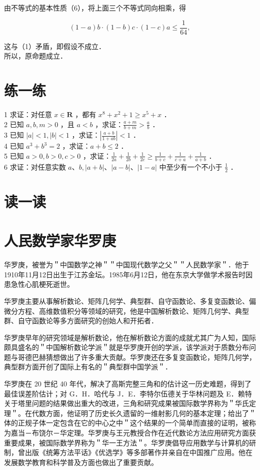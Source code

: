 \documentclass[10pt]{article}
\begin{document}
由不等式的基本性质（6），将上面三个不等式同向相乘，得

\[
(1-a) b \cdot(1-b) c \cdot(1-c) a \leqslant \frac{1}{64},
\]

这与（1）矛盾，即假设不成立．\\
所以，原命题成立．

\section*{练一练}
1 求证：对任意 \(x \in \mathbf{R}\) ，都有 \(x^{8}+x^{2}+1 \geqslant x^{5}+x\) ．\\
2 已知 \(a, b, m>0\) ，且 \(a<b\) ，求证：\(\frac{a+m}{b+m}>\frac{a}{b}\) ．\\
3 已知 \(|a|<1,|b|<1\) ，求证：\(\left|\frac{a+b}{1+a b}\right|<1\) ．\\
4 已知 \(a^{3}+b^{3}=2\) ，求证：\(a+b \leqslant 2\) ．\\
5 已知 \(a>0, b>0, c>0\) ，求证：\(\frac{1}{2 a}+\frac{1}{2 b}+\frac{1}{2 c} \geqslant \frac{1}{b+c}+\frac{1}{c+a}+\frac{1}{a+b}\) ．\\
6 求证：对任意实数 \(a 、 b,|a+b| 、|a-b| 、|1-a|\) 中至少有一个不小于 \(\frac{1}{2}\) ．

\section*{读一读}
\section*{人民数学家华罗庚}
华罗庚，被誉为＂中国数学之神＂＂中国现代数学之父＂＂人民数学家＂．他于1910年11月12日出生于江苏金坛。1985年6月12日，他在东京大学做学术报告时因患急性心肌梗死逝世。

华罗庚主要从事解析数论、矩阵几何学、典型群、自守函数论、多复变函数论、偏微分方程、高维数值积分等领域的研究，他是中国解析数论、矩阵几何学、典型群、自守函数论等多方面研究的创始人和开拓者．

华罗庚早年的研究领域是解析数论，他在解析数论方面的成就尤其广为人知，国际颇具盛名的＂中国解析数论学派＂就是华罗庚开创的学派，该学派对于质数分布问题与哥德巴赫猜想做出了许多重大贡献。华罗庚还在多复变函数论，矩阵几何学，典型群方面开创了国际上有名的＂典型群中国学派＂．

华罗庚在 20 世纪 40 年代，解决了高斯完整三角和的估计这一历史难题，得到了最佳误差阶估计；对 G．H．哈代与 J．E．李特尔伍德关于华林问题及 E．赖特关于塔里问题的结果做出重大的改进，三角和研究成果被国际数学界称为＂华氏定理＂。在代数方面，他证明了历史长久遗留的一维射影几何的基本定理；给出了＂体的正规子体一定包含在它的中心之中＂这个结果的一个简单而直接的证明，被称为嘉当－布饶尔－华定理。华罗庚与王元教授合作在近代数论方法应用研究方面获重要成果，被国际数学界称为＂华一王方法＂。华罗庚倡导应用数学与计算机的研制，曾出版《统筹方法平话》《优选学》等多部著作并亲自在中国推广应用。他在发展数学教育和科学普及方面也做出了重要贡献。
\end{document}
